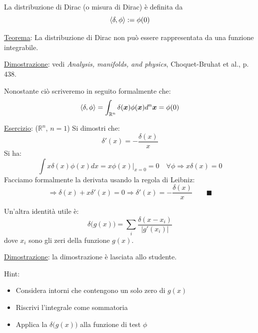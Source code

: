 \documentclass[a4paper,11pt]{report}
\newcommand{\Rn}{\mathbb{R}^n}
\newcommand{\x}{\boldsymbol{x}}
\begin{document}
La distribuzione di Dirac (o misura di Dirac) \`e definita da 
\begin{equation}
\Braket{\delta,\phi} := \phi(0) 
\end{equation}

\underline{Teorema}: La distribuzione di Dirac non pu\`o essere rappresentata da una funzione integrabile. 

\underline{Dimostrazione}: vedi \emph{Analysis, manifolds, and physics}, Choquet-Bruhat et al., p. 438. 

\medskip

Nonostante ci\`o scriveremo in seguito formalmente che:
\begin{equation}
\Braket{\delta , \phi} = \int_{\Rn} \delta (\x) \phi(\x) d^n \x= \phi(0) 
\end{equation}

\underline{Esercizio}: ($ \mathbb{R}^n$, $n=1$) Si dimostri che:
\begin{equation}
\delta' (x) =-\frac{\delta(x)}{x}
\end{equation}
Si ha:
\[
\int x\delta(x)\phi(x)dx = x\phi(x)\Big|_{x=0}=0 \quad \forall \phi \Rightarrow x\delta(x)=0
\]
Facciamo formalmente la derivata usando la regola di Leibniz:
\[
\Rightarrow \delta(x) + x\delta'(x)=0 \Rightarrow \delta ' (x) = -\frac{\delta(x)}{x}  \qquad \blacksquare
\]

Un'altra identit\`a utile \`e:
\begin{equation}
\delta\big(g(x)\big) = \sum_{i}\frac{\delta(x-x_i)}{|g'(x_i)|} 
\end{equation} 
dove $x_i$ sono gli zeri della funzione $g(x)$.

\underline{Dimostrazione}: la dimostrazione \`e lasciata allo studente.

Hint:
\begin{itemize}
\item Considera intorni che contengono un solo zero di $g(x)$
\item Riscrivi l'integrale come sommatoria
\item Applica la $\delta\big(g(x)\big)$ alla funzione di test $\phi$
\end{itemize}
\end{document}
